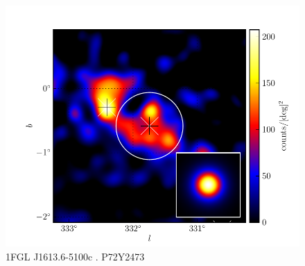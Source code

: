\documentclass[preprint]{aastex}
\begin{document}
\begin{figure}
  \begin{center}
    \includegraphics[type=pdf,ext=.pdf,read=.pdf]{source_plots/source_1FGL_J1613.6-5100c}
  \end{center}
  \caption{
  1FGL J1613.6-5100c . P72Y2473
  }\label{1FGL_J1613.6-5100c}
\end{figure}
\end{document}
